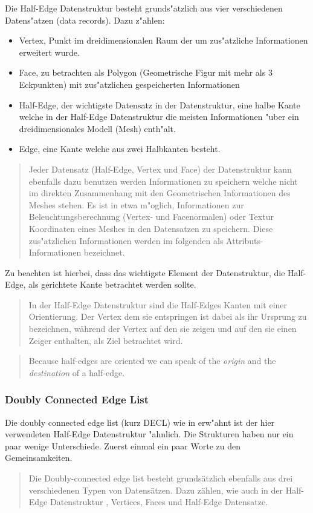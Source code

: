 \documentclass[pagesize, paper=a4, fontsize=12pt,titlepage=true, headings=small, headnosepline, abstractoff, liststotoc, nochapterprefix, plainheadsepline]{scrreprt}
\newcommand{\HES}{Half-Edge Datenstruktur }
\begin{document}
Die \HES besteht grunds"atzlich aus vier verschiedenen Datens"atzen (data records). Dazu z"ahlen:
\begin{itemize}
\item Vertex, Punkt im dreidimensionalen Raum der um zus"atzliche Informationen erweitert wurde. 
\item Face, zu betrachten als Polygon (Geometrische Figur mit mehr als 3 Eckpunkten) mit zus"atzlichen gespeicherten Informationen
\item Half-Edge, der wichtigste Datensatz in der Datenstruktur, eine halbe Kante welche in der \HES die meisten Informationen "uber ein dreidimensionales Modell (Mesh) enth"alt.
\item Edge, eine Kante welche aus zwei Halbkanten besteht.
\end{itemize}

\begin{quote}Jeder Datensatz (Half-Edge, Vertex und Face) der Datenstruktur kann ebenfalls dazu benutzen werden Informationen zu speichern welche nicht im direkten Zusammenhang mit den Geometrischen Informationen des Meshes stehen. Es ist in etwa m"oglich, Informationen zur Beleuchtungsberechnung (Vertex- und Facenormalen) oder Textur Koordinaten eines Meshes in den Datens{\dq}atzen zu speichern. Diese zus"atzlichen Informationen werden im folgenden als Attributs-Informationen bezeichnet. \cite[S.~31]{vanMarkdeBerg.2008}\end{quote}

Zu beachten ist hierbei, dass das wichtigste Element der Datenstruktur, die Half-Edge, als gerichtete Kante betrachtet werden sollte.
\begin{quote}In der Half-Edge Datenstruktur sind die Half-Edges Kanten mit einer Orientierung. Der Vertex dem sie entspringen ist dabei als ihr Ursprung zu bezeichnen, w{\"a}hrend der Vertex auf den sie zeigen und auf den sie einen Zeiger enthalten, als Ziel betrachtet wird. \cite[S.~31]{vanMarkdeBerg.2008}\end{quote}

\begin{quote}{\glqq}Because half-edges are oriented we can speak of the \textit{origin }and the \textit{destination }of a half-edge.{\grqq} \cite[S.~31]{vanMarkdeBerg.2008}\end{quote}

			\subsubsection {Doubly Connected Edge List}
				Die doubly connected edge list (kurz DECL) wie in \cite{vanMarkdeBerg.2008} erw"ahnt ist der hier verwendeten \HES "ahnlich. Die Strukturen haben nur ein paar wenige Unterschiede. Zuerst einmal ein paar Worte zu den Gemeinsamkeiten. \begin{quote}Die Doubly-connected edge list besteht grunds{\"a}tzlich ebenfalls aus drei verschiedenen Typen von Datens{\"a}tzen. Dazu z{\"a}hlen, wie auch in der \HES, Vertices, Faces und Half-Edge Datens{\dq}atze. \cite[S.~31]{vanMarkdeBerg.2008}\end{quote}
\end{document}
